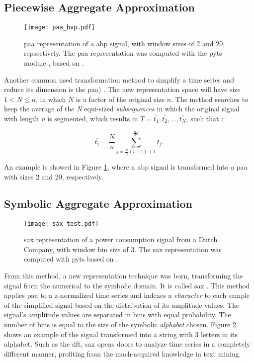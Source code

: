 \subsection{Piecewise Aggregate Approximation}
\label{subsec:paa}

\begin{figure}[!h]
\centering
\texttt{[image: paa\_bvp.pdf]}
\caption{\gls{paa} representation of a \gls{abp} signal, with window sizes of 2 and 20, repsectively. The \gls{paa} representation was computed with the \gls{pyts} module \cite{pyts}, based on \cite{paa}.}
\label{fig:paa}
\end{figure}

Another common used transformation method to simplify a time series and reduce its dimension is the \gls{paa}) \cite{paa}. The new representation space will have size $1 < N \leq n$, in which $N$ is a factor of the original size $n$. The method searches to keep the average of the \textit{N} equi-sized \textit{subsequences} in which the original signal with length \textit{n} is segmented, which results in $\overline{T} = \overline{t_1}, \overline{t_2}, ...,\overline{t_N}$, such that \cite{paa}:

\begin{equation}
\overline{t_i} = \frac{N}{n} \sum^{\frac{n}{N}i}_{j=\frac{n}{N}(i-1)+1} t_j.
\end{equation}

An example is showed in Figure \ref{fig:paa}, where a \gls{abp} signal is transformed into a \gls{paa} with sizes 2 and 20, respectively.
    
\subsection{Symbolic Aggregate Approximation}
\label{subsec:sax}

\begin{figure}
\centering
\texttt{[image: sax\_test.pdf]}
\caption{\gls{sax} representation of a power consumption signal from a Dutch Company, with window bin size of 3. The \gls{sax} representation was computed with \gls{pyts} based on \cite{sax}.}
\label{fig:sax}
\end{figure}

From this method, a new representation technique was born, transforming the signal from the numerical to the symbolic domain. It is called \gls{sax} \cite{sax}. This method applies \gls{paa} to a z-normalized time series and indexes a \textit{character} to each sample of the simplified signal based on the distribution of its amplitude values. The signal's amplitude values are separated in bins with equal probability. The number of bins is equal to the size of the symbolic \textit{alphabet} chosen. Figure \ref{fig:sax} shows an example of the signal transformed into a string with 3 letters in its alphabet. Such as the \gls{dft}, \gls{sax} opens doors to analyze time series in a completely different manner, profiting from the much-acquired knowledge in text mining.

